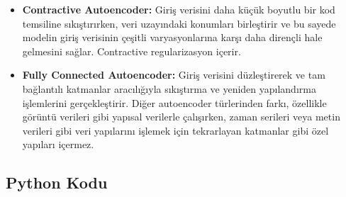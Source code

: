 \begin{itemize}
    \item \textbf{Contractive Autoencoder:} Giriş verisini daha küçük boyutlu bir kod temsiline sıkıştırırken, veri uzayındaki konumları birleştirir ve bu sayede modelin giriş verisinin çeşitli varyasyonlarına karşı daha dirençli hale gelmesini sağlar. Contractive regularizasyon içerir.
    \item \textbf{Fully Connected Autoencoder:} Giriş verisini düzleştirerek ve tam bağlantılı katmanlar aracılığıyla sıkıştırma ve yeniden yapılandırma işlemlerini gerçekleştirir. Diğer autoencoder türlerinden farkı, özellikle görüntü verileri gibi yapısal verilerle çalışırken, zaman serileri veya metin verileri gibi veri yapılarını işlemek için tekrarlayan katmanlar gibi özel yapıları içermez.
\end{itemize}

\subsection{Python Kodu}

